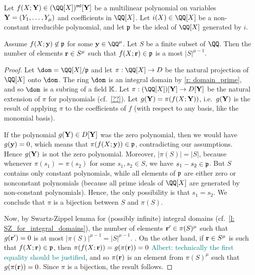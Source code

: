 \documentclass[11pt,letterpaper,usenames,dvipsnames]{article}
\newcommand{\albert}[1]{\textcolor{teal}{Albert: {#1}}}
\begin{document}
  \begin{lemma}
  Let $f(X;\YY) \in (\QQ[X])^{\multilin}[\YY]$ be a multilinear polynomial on variables $\mathbf{Y}= (Y_1,\ldots, Y_\mu)$ and coefficients in $\QQ[X]$. Let $i(X) \in \QQ[X]$ be a non-constant irreducible polynomial, and let $\mathfrak{p}$ be the ideal of $\QQ[X]$ generated by $i$. 
  
  Assume $f(X;\mathbf{y})\not\in \mathfrak{p}$ for some $\yy\in \QQ^\mu$. Let $S$ be a finite subset of $\QQ$. Then the number of elements $\mathbf{r}\in S^\mu$ such that $f(X;\mathbf{r})\in \mathfrak{p}$ is a most $|S|^{\mu-1}$.
  \end{lemma}
  \begin{proof}
  Let $\dom= \QQ[X]/\primeideal$ and let  $\pi:\QQ[X] \to D$ be the natural projection of $\QQ[X]$ onto $\dom$. The ring $\dom$ is an integral domain by \cref{r: domain_prime}, and so $\dom$ is a subring of a field $\mathbb{K}$. Let $\pi:(\QQ[X])[\YY]\to D[\YY]$ be the natural extension of $\pi$ for polynomials (cf.\ \cref{??}). Let $g(\mathbf{Y}) = \pi(f(X;\mathbf{Y}))$, i.e.\ $g(\mathbf{Y})$ is the result of applying $\pi$ to the coefficients of $f$ (with respect to any basis, like the monomial basis). 
  
    If the polynomial $g(\mathbf{Y}) \in D[\mathbf{Y}]$ was the zero polynomial, then we would have $g(\mathbf{y}) = 0$, which means that $\pi(f(X;\mathbf{y}))\in \mathfrak{p}$, contradicting our assumptions. Hence $g(\mathbf{Y})$ is not the zero polynomial. Moreover, $|\pi(S)|=|S|$, because whenever $\pi(s_1) = \pi(s_2)$ for some $s_1,s_2\in S$, we have $s_1 - s_2 \in  \mathfrak{p}$. But $S$ contains only constant polynomials, while all elements of $\mathfrak{p}$ are either zero or nonconstant polynomials (because all prime ideals of $\QQ[X]$ are generated by non-constant polynomials). Hence, the only possibility is that $s_1=s_2$.  We conclude that $\pi$ is a bijection between $S$ and $\pi(S)$.
    
    Now, by Swartz-Zippel lemma for (possibly infinite) integral domains (cf.\ \cref{l: SZ_for_integral_domains}), the number of elements $\mathbf{r}'\in \pi(S)^\mu$ such that $g(\mathbf{r}')=0$ is at most $|\pi(S)|^{\mu-1}= |S|^{\mu-1}$. . On the other hand, if $\mathbf{r}\in S^\mu$ is such that $f(X;\mathbf{r})\in \mathfrak{p}$, then $\pi(f(X;\mathbf{r}))=g(\pi(\mathbf{r}))=0$ \albert{technically the first equality should be justified}, and so $\pi(\mathbf{r})$ is an element from $\pi(S)^{\mu}$ such that $g(\pi(\mathbf{r}))=0$. Since $\pi$ is a bijection, the result follows.
  \end{proof}
\end{document}
